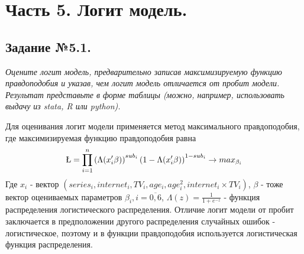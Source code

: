 \documentclass[a4paper,12pt]{article}
\begin{document}
	\newpage
	
	\section{Часть 5. Логит модель.}
	
	\subsection{Задание №5.1.}
	\textit{
	Оцените логит модель, предварительно записав максимизируемую функцию правдоподобия и указав, чем логит модель отличается от пробит модели. Результат представьте в форме таблицы (можно, например, использовать выдачу из stata, R или python).}
	
	\vspace{0.2cm}
	
	Для оценивания логит модели применяется метод максимального правдоподобия, где максимизируемая функцию правдоподобия равна
	\begin{align*}
		\L = \prod_{i=1}^{n}\left(\Lambda(x_i'\beta)\right)^{sub_i} \left(1-\Lambda(x_i'\beta)\right)^{1-sub_i} \rightarrow max_{\beta_i}
	\end{align*}
	Где $x_i$ - вектор  $(series_i, internet_i, TV_i, age_i, age_i^2, internet_i\times TV_i)$, $\beta$ - тоже вектор оцениваемых параметров $\beta_i, i = \overline{0, 6}$, $\Lambda(z) = \frac{1}{1+e^{-z}}$ - функция распределения логистического распределения. Отличие логит модели от пробит заключается в предположении другого распределения случайных ошибок - логистическое, поэтому и в функции правдоподобия используется логистическая функция распределения.
	
\end{document}
